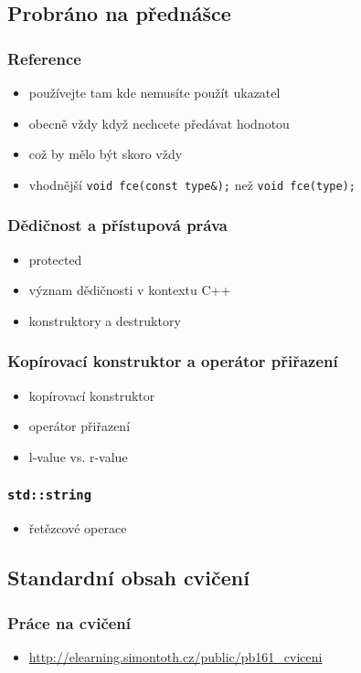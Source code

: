 \subsection{Probráno na přednášce}

\begin{frame}
	\frametitle{Reference}
	\begin{itemize}
		\item{používejte tam kde nemusíte použít ukazatel}
		\item{obecně vždy když nechcete předávat hodnotou} \pause
		\item{což by mělo být skoro vždy}
		\item{vhodnější \texttt{void fce(const type\&);} než \texttt{void fce(type);}}
	\end{itemize}
\end{frame}

\begin{frame}
	\frametitle{Dědičnost a přístupová práva}
	\begin{itemize}
		\item{protected}
		\item{význam dědičnosti v kontextu C++}
		\item{konstruktory a destruktory}
	\end{itemize}
\end{frame}

\begin{frame}
	\frametitle{Kopírovací konstruktor a operátor přiřazení}
	\begin{itemize}
		\item{kopírovací konstruktor}
		\item{operátor přiřazení}
			\item{l-value vs. r-value}
	\end{itemize}
\end{frame}

\begin{frame}
	\frametitle{\texttt{std::string}}
	\begin{itemize}
			\item{řetězcové operace}
	\end{itemize}
\end{frame}

\subsection{Standardní obsah cvičení}

\begin{frame}
	\frametitle{Práce na cvičení}
	\begin{itemize}
		\item{\href{http://elearning.simontoth.cz/public/pb161\_cviceni}{http://elearning.simontoth.cz/public/pb161\_cviceni}}
	\end{itemize}
\end{frame}




